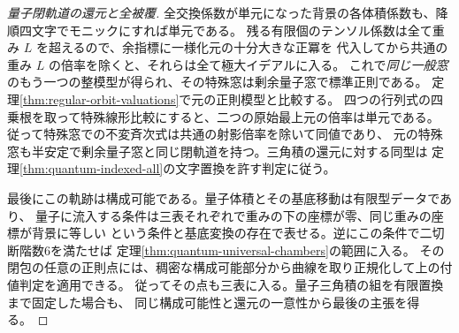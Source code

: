 \begin{proof}[量子閉軌道の還元と全被覆]
全交換係数が単元になった背景の各体積係数も、降順四文字でモニックにすれば単元である。
残る有限個のテンソル係数は全て重み $L$ を超えるので、余指標に一様化元の十分大きな正冪を
代入してから共通の重み $L$ の倍率を除くと、それらは全て極大イデアルに入る。
これで\emph{同じ一般窓}のもう一つの整模型が得られ、その特殊窓は剰余量子窓で標準正則である。
定理\ref{thm:regular-orbit-valuations}で元の正則模型と比較する。
四つの行列式の四乗根を取って特殊線形比較にすると、二つの原始最上元の倍率は単元である。
従って特殊窓での不変斉次式は共通の射影倍率を除いて同値であり、
元の特殊窓も半安定で剰余量子窓と同じ閉軌道を持つ。三角積の還元に対する同型は
定理\ref{thm:quantum-indexed-all}の文字置換を許す判定に従う。

最後にこの軌跡は構成可能である。量子体積とその基底移動は有限型データであり、
量子に流入する条件は三表それぞれで重みの下の座標が零、同じ重みの座標が背景に等しい
という条件と基底変換の存在で表せる。逆にこの条件で二切断階数6を満たせば
定理\ref{thm:quantum-universal-chambers}の範囲に入る。
その閉包の任意の正則点には、稠密な構成可能部分から曲線を取り正規化して上の付値判定を適用できる。
従ってその点も三表に入る。量子三角積の組を有限置換まで固定した場合も、
同じ構成可能性と還元の一意性から最後の主張を得る。
\end{proof}
